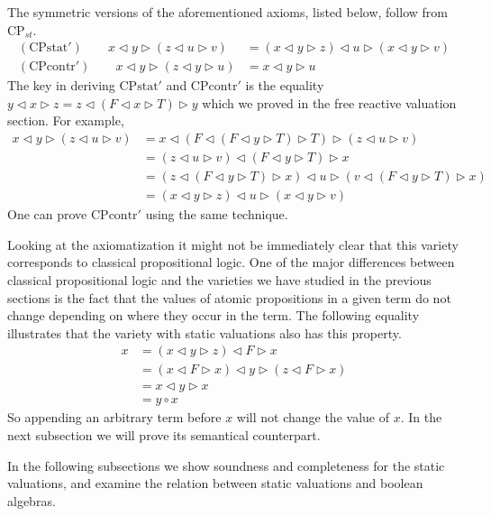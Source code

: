 \documentclass[a4paper,twoside,openright]{report}
\newcommand{\CPcontr}{\ensuremath{\mathrm{CPcontr}}}
\newcommand{\CPstat}{\ensuremath{\mathrm{CPstat}}}
\newcommand{\lef}{\ensuremath{\triangleleft}}
\newcommand{\rig}{\ensuremath{\triangleright}}
\begin{document}
The symmetric versions of the aforementioned axioms, listed below, follow from $\text{CP}_{st}$.
\begin{align*}
(\CPstat')\qquad x\lef y\rig(z\lef u\rig v) &=
(x\lef y\rig z)\lef u\rig(x\lef y\rig v)\\
(\CPcontr')\qquad x\lef y\rig(z\lef y\rig u) &=
x\lef y\rig u
\end{align*}
The key in deriving $\CPstat'$ and $\CPcontr'$ is the equality $y\lef x\rig z=z\lef(F\lef x\rig T)\rig y$ which we proved in the free reactive valuation section. For example,
\begin{align*}
x\lef y\rig(z\lef u\rig v)
&= x\lef(F\lef(F\lef y\rig T)\rig T)\rig(z\lef u\rig v)\\
&= (z\lef u\rig v)\lef(F\lef y\rig T)\rig x\\
&= (z\lef(F\lef y\rig T)\rig x)\lef u\rig (v\lef(F\lef y\rig T)\rig x)\\
&= (x\lef y\rig z)\lef u\rig(x\lef y\rig v)
\end{align*}
One can prove $\CPcontr'$ using the same technique.

Looking at the axiomatization it might not be immediately clear that this variety corresponds to classical propositional logic. One of the major differences between classical propositional logic and the varieties we have studied in the previous sections is the fact that the values of atomic propositions in a given term do not change depending on where they occur in the term. The following equality illustrates that the variety with static valuations also has this property.
\begin{align*}
x
&= (x\lef y\rig z)\lef F\rig x\\
&= (x\lef F\rig x)\lef y\rig (z\lef F\rig x)\\
&= x\lef y\rig x\\
&= y\circ x
\end{align*}
So appending an arbitrary term before $x$ will not change the value of $x$. In the next subsection we will prove its semantical counterpart.

In the following subsections we show soundness and completeness for the static valuations, and examine the relation between static valuations and boolean algebras.
\end{document}
